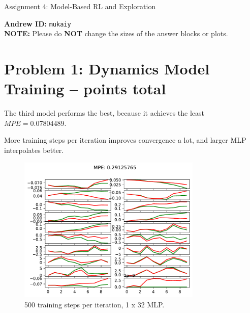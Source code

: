 \documentclass{article}
\begin{document}

\begin{centering}
    {\Large Assignment 4: Model-Based RL and Exploration
    } \\
    \vspace{.25cm}
\end{centering}
\vspace{0.25cm}

\textbf{Andrew ID:} \texttt{mukaiy} \\
\textbf{NOTE:} Please do \textbf{NOT} change the sizes of the answer blocks or plots.

\section{Problem 1: Dynamics Model Training --  points total\rbrack}
\begin{answer}[title=Theory questions,height=4.5cm,width=\linewidth]
    The third model performs the best, because it achieves the least $MPE = 0.07804489$.

    More training steps per iteration improves convergence a lot, and larger MLP interpolates better.
\end{answer}


\begin{answer}[title=Plot,height=9.5cm,width=\linewidth]
    \begin{figure}[H]
        \centering
        \includegraphics[height=7cm]{figs/P1_1.pdf}
        \caption{500 training steps per iteration, 1 x 32 MLP.}
    \end{figure}
\end{answer}
\end{document}
